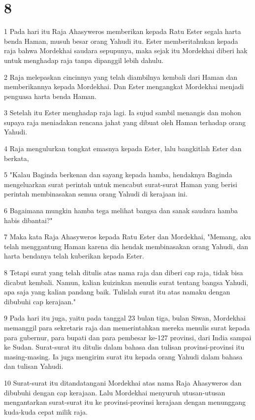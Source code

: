 \chapter{8}

\par 1 Pada hari itu Raja Ahasyweros memberikan kepada Ratu Ester segala harta benda Haman, musuh besar orang Yahudi itu. Ester memberitahukan kepada raja bahwa Mordekhai saudara sepupunya, maka sejak itu Mordekhai diberi hak untuk menghadap raja tanpa dipanggil lebih dahulu.
\par 2 Raja melepaskan cincinnya yang telah diambilnya kembali dari Haman dan memberikannya kepada Mordekhai. Dan Ester mengangkat Mordekhai menjadi penguasa harta benda Haman.
\par 3 Setelah itu Ester menghadap raja lagi. Ia sujud sambil menangis dan mohon supaya raja meniadakan rencana jahat yang dibuat oleh Haman terhadap orang Yahudi.
\par 4 Raja mengulurkan tongkat emasnya kepada Ester, lalu bangkitlah Ester dan berkata,
\par 5 "Kalau Baginda berkenan dan sayang kepada hamba, hendaknya Baginda mengeluarkan surat perintah untuk mencabut surat-surat Haman yang berisi perintah membinasakan semua orang Yahudi di kerajaan ini.
\par 6 Bagaimana mungkin hamba tega melihat bangsa dan sanak saudara hamba habis dibantai?"
\par 7 Maka kata Raja Ahasyweros kepada Ratu Ester dan Mordekhai, "Memang, aku telah menggantung Haman karena dia hendak membinasakan orang Yahudi, dan harta bendanya telah kuberikan kepada Ester.
\par 8 Tetapi surat yang telah ditulis atas nama raja dan diberi cap raja, tidak bisa dicabut kembali. Namun, kalian kuizinkan menulis surat tentang bangsa Yahudi, apa saja yang kalian pandang baik. Tulislah surat itu atas namaku dengan dibubuhi cap kerajaan."
\par 9 Pada hari itu juga, yaitu pada tanggal 23 bulan tiga, bulan Siwan, Mordekhai memanggil para sekretaris raja dan memerintahkan mereka menulis surat kepada para gubernur, para bupati dan para pembesar ke-127 provinsi, dari India sampai ke Sudan. Surat-surat itu ditulis dalam bahasa dan tulisan provinsi-provinsi itu masing-masing. Ia juga mengirim surat itu kepada orang Yahudi dalam bahasa dan tulisan Yahudi.
\par 10 Surat-surat itu ditandatangani Mordekhai atas nama Raja Ahasyweros dan dibubuhi dengan cap kerajaan. Lalu Mordekhai menyuruh utusan-utusan mengantarkan surat-surat itu ke provinsi-provinsi kerajaan dengan menunggang kuda-kuda cepat milik raja.
